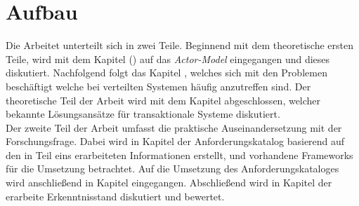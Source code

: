\section{Aufbau}
Die Arbeitet unterteilt sich in zwei Teile. Beginnend mit dem theoretische ersten Teile, wird mit dem Kapitel  () auf das \textit{Actor-Model} eingegangen und dieses diskutiert. Nachfolgend folgt das Kapitel , welches sich mit den Problemen beschäftigt welche bei verteilten Systemen häufig anzutreffen sind. Der theoretische Teil der Arbeit wird mit dem Kapitel  abgeschlossen, welcher bekannte Lösungsansätze für transaktionale Systeme diskutiert. \\
Der zweite Teil der Arbeit umfasst die praktische Auseinandersetzung mit der Forschungsfrage. Dabei wird in Kapitel  der Anforderungskatalog basierend auf den in Teil eins erarbeiteten Informationen erstellt, und vorhandene Frameworks für die Umsetzung betrachtet. Auf die Umsetzung des Anforderungskataloges wird anschließend in Kapitel  eingegangen. Abschließend wird in Kapitel  der erarbeite Erkenntnisstand diskutiert und bewertet.  